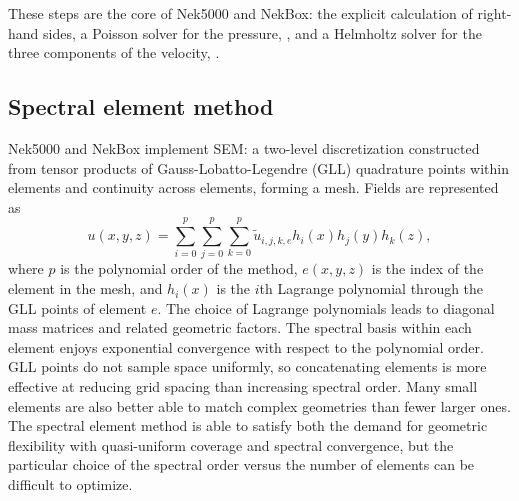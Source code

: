 \begin{comment}
\begin{pmatrix} \mathbf{H} & -\frac{6 \Delta t}{11} \mathbf{H} \mathbf{M}^{-1} \mathbf{D}^T \\ 0 & \frac{6 \Delta t}{11} \mathbf{D} \mathbf{M}^{-1} \mathbf{D}^T \end{pmatrix} \begin{pmatrix} v^{n+1} \\ p^{n+1} \end{pmatrix} \approx \begin{pmatrix} \hat{v} \\ \nabla \cdot \hat{v} \end{pmatrix}.
\end{equation}

The scheme in \eref{NS3} represents a sequence of solves:
\begin{inparaenum}[\itshape a\upshape)]
\item explicit convection $\hat{v} = F$;
\item Poisson pressure equation $\bigtriangleup p^{n+1} = \nabla \cdot \hat{v}$; and
\item Helmholtz velocity equation $H v_i^{n+1} = \hat{v}_i - \nabla_i p^{n+1}$.
\end{inparaenum}
\end{comment}

These steps are the core of Nek5000 and NekBox: the explicit calculation of
right-hand sides, a Poisson solver for the pressure, , and a Helmholtz solver for the three components of the velocity, .

\subsection{Spectral element method}
Nek5000 and NekBox implement SEM: a two-level discretization constructed from tensor products of Gauss-Lobatto-Legendre (GLL) quadrature points within elements and continuity across elements, forming a mesh.
Fields are represented as
\begin{equation}
u(x,y,z) = \sum_{i=0}^p \sum_{j=0}^p \sum_{k=0}^p \tilde{u}_{i,j,k,e} h_i(x) h_j(y) h_k(z), 
\end{equation}
where $p$ is the polynomial order of the method,
$e(x,y,z)$ is the index of the element in the mesh,
and $h_i(x)$ is the $i$th Lagrange polynomial through the GLL points of element $e$.
The choice of Lagrange polynomials leads to diagonal mass matrices and related geometric factors.
The spectral basis within each element enjoys exponential convergence with respect to the polynomial order.
GLL points do not sample space uniformly, so concatenating elements is more effective at reducing grid spacing than increasing spectral order.
Many small elements are also better able to match complex geometries than fewer larger ones.
The spectral element method is able to satisfy both the demand for geometric flexibility with quasi-uniform coverage and spectral convergence, but the particular choice of the spectral order versus the number of elements can be difficult to optimize.

